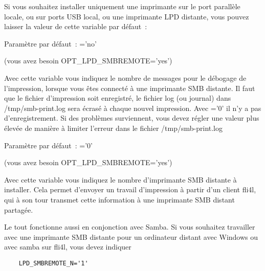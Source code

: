\begin{description}

    Si vous souhaitez installer uniquement une imprimante sur le port parallèle
    locale, ou sur ports USB local, ou une imprimante LPD distante, vous pouvez
    laisser la valeur de cette variable par défaut~:

    Paramètre par défaut~: ='no'


 (vous avez besoin OPT\_LPD\_SMBREMOTE='yes')

    Avec cette variable  vous indiquez le nombre
    de messages pour le débogage de l'impression, lorsque vous êtes connecté à
    une imprimante SMB distante. Il faut que le fichier d'impression soit enregistré,
    le fichier log (ou journal) dans /tmp/smb-print.log sera écrasé à chaque nouvel
    impression. Avec ='0' il n'y a pas
    d'enregistrement. Si des problèmes surviennent, vous devez régler une valeur
    plus élevée de manière à limiter l'erreur dans le fichier /tmp/smb-print.log

    Paramètre par défaut~: ='0'


 (vous avez besoin OPT\_LPD\_SMBREMOTE='yes')

    Avec cette variable  vous indiquez le nombre
    d'imprimante SMB distante à installer. Cela permet d'envoyer un travail
    d'impression à partir d'un client fli4l, qui à son tour transmet cette
    information à une imprimante SMB distant partagée.

    Le tout fonctionne aussi en conjonction avec Samba. Si vous souhaitez travailler
    avec une imprimante SMB distante pour un ordinateur distant avec Windows
    ou avec samba sur fli4l, vous devez indiquer

\begin{example}
\begin{verbatim}
    LPD_SMBREMOTE_N='1'
\end{verbatim}
\end{example}


\end{description}
